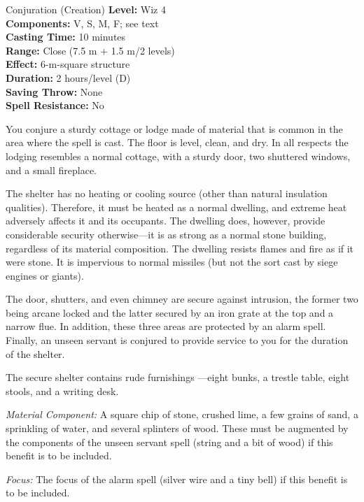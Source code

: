 {Conjuration (Creation)}
{
	\textbf{Level:}
	Wiz 4\\
	\textbf{Components:}
	V, S, M, F; see text\\
	\textbf{Casting Time:}
	10 minutes\\
	\textbf{Range:}
	Close (7.5 m + 1.5 m/2 levels)\\
	\textbf{Effect:}
	6-m-square structure\\
	\textbf{Duration:}
	2 hours/level (D)\\
	\textbf{Saving Throw:}
	None\\
	\textbf{Spell Resistance:}
	No\\
}
{
	You conjure a sturdy cottage or lodge made of material that is common in the area where the spell is cast. The floor is level, clean, and dry. In all respects the lodging resembles a normal cottage, with a sturdy door, two shuttered windows, and a small fireplace.

	The shelter has no heating or cooling source (other than natural insulation qualities). Therefore, it must be heated as a normal dwelling, and extreme heat adversely affects it and its occupants. The dwelling does, however, provide considerable security otherwise---it is as strong as a normal stone building, regardless of its material composition. The dwelling resists flames and fire as if it were stone. It is impervious to normal missiles (but not the sort cast by siege engines or giants).

	The door, shutters, and even chimney are secure against intrusion, the former two being arcane locked and the latter secured by an iron grate at the top and a narrow flue. In addition, these three areas are protected by an alarm spell. Finally, an unseen servant is conjured to provide service to you for the duration of the shelter.

	The secure shelter contains rude furnishings ---eight bunks, a trestle table, eight stools, and a writing desk.

	\textit{Material Component:}
	A square chip of stone, crushed lime, a few grains of sand, a sprinkling of water, and several splinters of wood. These must be augmented by the components of the unseen servant spell (string and a bit of wood) if this benefit is to be included.

	\textit{Focus:}
	The focus of the alarm spell (silver wire and a tiny bell) if this benefit is to be included.

}
